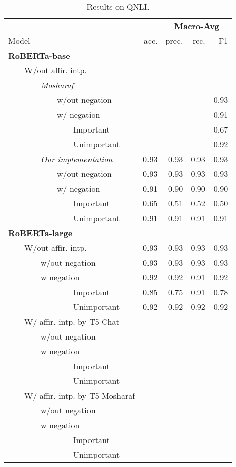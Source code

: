 \begin{table*}
\centering
\begin{tabular}{lrrrr}
\toprule
&& \multicolumn{3}{c}{\textbf{Macro-Avg}} \\
Model & acc. & prec. & rec. & F1 \\
\midrule
\textbf{RoBERTa-base} \\
~~~~W/out affir. intp. \\
~~~~~~~~\textit{Mosharaf} \\
~~~~~~~~~~~~w/out negation &&&&0.93\\ 
~~~~~~~~~~~~w/ negation &&&&0.91\\ 
~~~~~~~~~~~~~~~~Important &&&&0.67\\ 
~~~~~~~~~~~~~~~~Unimportant &&&&0.92\\ 
\midrule
~~~~~~~~\textit{Our implementation}  & 0.93 & 0.93 & 0.93 & 0.93 \\ 
~~~~~~~~~~~~w/out negation  & 0.93 & 0.93 & 0.93 & 0.93 \\
~~~~~~~~~~~~w/ negation  & 0.91 & 0.90 & 0.90 & 0.90 \\
~~~~~~~~~~~~~~~~Important  & 0.65 & 0.51 & 0.52 & 0.50 \\  
~~~~~~~~~~~~~~~~Unimportant  & 0.91 & 0.91 & 0.91 & 0.91 \\ 
\bottomrule
\textbf{RoBERTa-large} \\
~~~~W/out affir. intp.  & 0.93 & 0.93 & 0.93 & 0.93 \\ 
~~~~~~~~w/out negation  & 0.93 & 0.93 & 0.93 & 0.93 \\ 
~~~~~~~~w negation  & 0.92 & 0.92 & 0.91 & 0.92 \\  
~~~~~~~~~~~~~~~~Important  & 0.85 & 0.75 & 0.91 & 0.78 \\ 
~~~~~~~~~~~~~~~~Unimportant  & 0.92 & 0.92 & 0.92 & 0.92 \\ 
\midrule
~~~~W/ affir. intp. by T5-Chat \\
~~~~~~~~w/out negation \\ 
~~~~~~~~w negation \\ 
~~~~~~~~~~~~~~~~Important \\ 
~~~~~~~~~~~~~~~~Unimportant \\ 
\midrule
~~~~W/ affir. intp. by T5-Mosharaf \\
~~~~~~~~w/out negation \\ 
~~~~~~~~w negation \\ 
~~~~~~~~~~~~~~~~Important \\ 
~~~~~~~~~~~~~~~~Unimportant \\ 
\bottomrule
\end{tabular}
\caption{Results on QNLI.}
\end{table*}